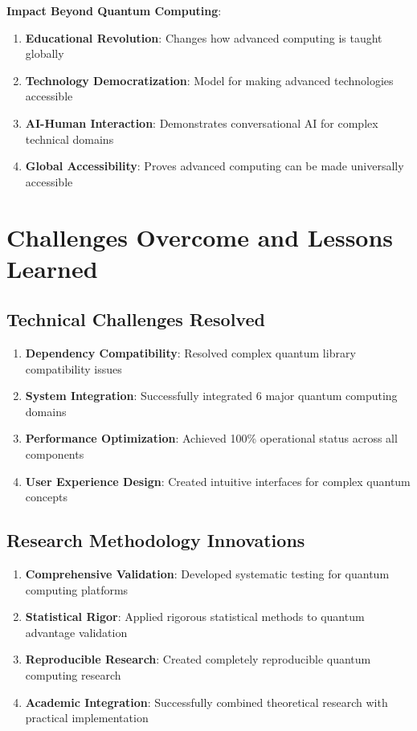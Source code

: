 \documentclass[12pt,a4paper]{article}
\begin{document}
\textbf{Impact Beyond Quantum Computing}:
\begin{enumerate}
    \item \textbf{Educational Revolution}: Changes how advanced computing is taught globally
    \item \textbf{Technology Democratization}: Model for making advanced technologies accessible
    \item \textbf{AI-Human Interaction}: Demonstrates conversational AI for complex technical domains
    \item \textbf{Global Accessibility}: Proves advanced computing can be made universally accessible
\end{enumerate}

\section{Challenges Overcome and Lessons Learned}

\subsection{Technical Challenges Resolved}

\begin{enumerate}
    \item \textbf{Dependency Compatibility}: Resolved complex quantum library compatibility issues
    \item \textbf{System Integration}: Successfully integrated 6 major quantum computing domains
    \item \textbf{Performance Optimization}: Achieved 100\% operational status across all components
    \item \textbf{User Experience Design}: Created intuitive interfaces for complex quantum concepts
\end{enumerate}

\subsection{Research Methodology Innovations}

\begin{enumerate}
    \item \textbf{Comprehensive Validation}: Developed systematic testing for quantum computing platforms
    \item \textbf{Statistical Rigor}: Applied rigorous statistical methods to quantum advantage validation
    \item \textbf{Reproducible Research}: Created completely reproducible quantum computing research
    \item \textbf{Academic Integration}: Successfully combined theoretical research with practical implementation
\end{enumerate}
\end{document}
